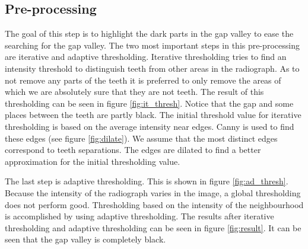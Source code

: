 \documentclass[a4paper,10pt]{article}
\begin{document}
\subsection{Pre-processing}
The goal of this step is to highlight the dark parts in the gap valley to ease the searching for the gap valley. The two most important steps in this pre-processing are iterative and adaptive thresholding. Iterative thresholding tries to find an intensity threshold to distinguish teeth from other areas in the radiograph. As to not remove any parts of the teeth it is preferred to only remove the areas of which we are absolutely sure that they are not teeth. The result of this thresholding can be seen in figure \ref{fig:it_thresh}. Notice that the gap and some places between the teeth are partly black. The initial threshold value for iterative thresholding is based on the average intensity near edges. Canny is used to find these edges (see figure \ref{fig:dilate}). We assume that the most distinct edges correspond to teeth separations. The edges are dilated to find a better approximation for the initial thresholding value.

The last step is adaptive thresholding. This is shown in figure \ref{fig:ad_thresh}. Because the intensity of the radiograph varies in the image, a global thresholding does not perform good. Thresholding based on the intensity of the neighbourhood is accomplished by using adaptive thresholding. The results after iterative thresholding and adaptive thresholding can be seen in figure \ref{fig:result}. It can be seen that the gap valley is completely black.
\end{document}

